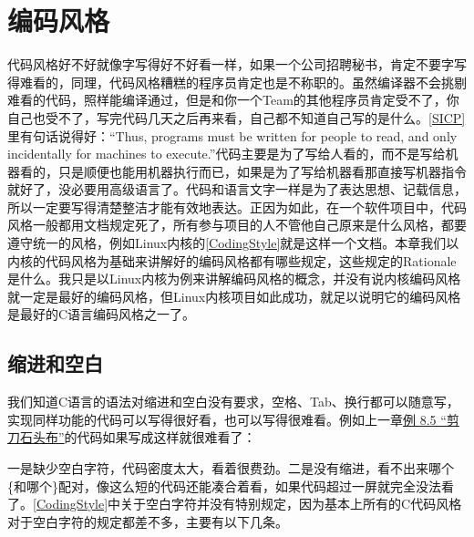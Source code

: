 

\chapter{编码风格}
%
代码风格好不好就像字写得好不好看一样，如果一个公司招聘秘书，肯定不要字写得难看的，同理，代码风格糟糕的程序员肯定也是不称职的。虽然编译器不会挑剔难看的代码，照样能编译通过，但是和你一个Team的其他程序员肯定受不了，你自己也受不了，写完代码几天之后再来看，自己都不知道自己写的是什么。\hyperlink{db.bi01.bibli.sicp}{[SICP]}里有句话说得好：“Thus, programs must be written for people to read, and only incidentally for machines to execute.\BookSplit{}”代码主要是为了写给人看的，而不是写给机器看的，只是顺便也能用机器执行而已，如果是为了写给机器看那直接写机器指令就好了，没必要用高级语言了。代码和语言文字一样是为了表达思想、记载信息，所以一定要写得清楚整洁才能有效地表达。正因为如此，在一个软件项目中，代码风格一般都用文档规定死了，所有参与项目的人不管他自己原来是什么风格，都要遵守统一的风格，例如Linux内核的\hyperlink{db.bi01.bibli.codingstyle}{[CodingStyle]}就是这样一个文档。本章我们以内核的代码风格为基础来讲解好的编码风格都有哪些规定，这些规定的Rationale是什么。我只是以Linux内核为例来讲解编码风格的概念，并没有说内核编码风格就一定是最好的编码风格，但Linux内核项目如此成功，就足以说明它的编码风格是最好的C语言编码风格之一了。




\section{缩进和空白}
%
我们知道C语言的语法对缩进和空白没有要求，空格、Tab、换行都可以随意写，实现同样功能的代码可以写得很好看，也可以写得很难看。例如上一章\hyperlink{db.ch08s05.id2735200}{例 8.\BookSplit{}5 “剪刀石头布”}的代码如果写成这样就很难看了：





一是缺少空白字符，代码密度太大，看着很费劲。二是没有缩进，看不出来哪个\{和哪个\}配对，像这么短的代码还能凑合着看，如果代码超过一屏就完全没法看了。\hyperlink{db.bi01.bibli.codingstyle}{[CodingStyle]}中关于空白字符并没有特别规定，因为基本上所有的C代码风格对于空白字符的规定都差不多，主要有以下几条。



